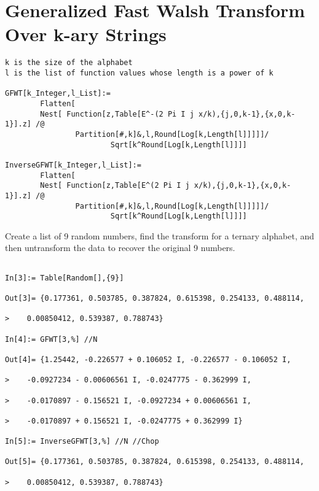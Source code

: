 \section{Generalized Fast Walsh Transform Over k-ary Strings}
\begin{verbatim}
k is the size of the alphabet
l is the list of function values whose length is a power of k

GFWT[k_Integer,l_List]:=
        Flatten[
        Nest[ Function[z,Table[E^-(2 Pi I j x/k),{j,0,k-1},{x,0,k-1}].z] /@
                Partition[#,k]&,l,Round[Log[k,Length[l]]]]]/
                        Sqrt[k^Round[Log[k,Length[l]]]]

InverseGFWT[k_Integer,l_List]:=
        Flatten[
        Nest[ Function[z,Table[E^(2 Pi I j x/k),{j,0,k-1},{x,0,k-1}].z] /@
                Partition[#,k]&,l,Round[Log[k,Length[l]]]]]/
                        Sqrt[k^Round[Log[k,Length[l]]]]

\end{verbatim}
\begin{example}
Create a list of 9 random numbers, find the transform for a ternary
alphabet, and then untransform the data to recover the original 9 numbers.
\end{example}
\begin{verbatim}

In[3]:= Table[Random[],{9}]

Out[3]= {0.177361, 0.503785, 0.387824, 0.615398, 0.254133, 0.488114, 
 
>    0.00850412, 0.539387, 0.788743}

In[4]:= GFWT[3,%] //N    

Out[4]= {1.25442, -0.226577 + 0.106052 I, -0.226577 - 0.106052 I, 
 
>    -0.0927234 - 0.00606561 I, -0.0247775 - 0.362999 I, 
 
>    -0.0170897 - 0.156521 I, -0.0927234 + 0.00606561 I, 
 
>    -0.0170897 + 0.156521 I, -0.0247775 + 0.362999 I}

In[5]:= InverseGFWT[3,%] //N //Chop

Out[5]= {0.177361, 0.503785, 0.387824, 0.615398, 0.254133, 0.488114, 
 
>    0.00850412, 0.539387, 0.788743}

\end{verbatim}
